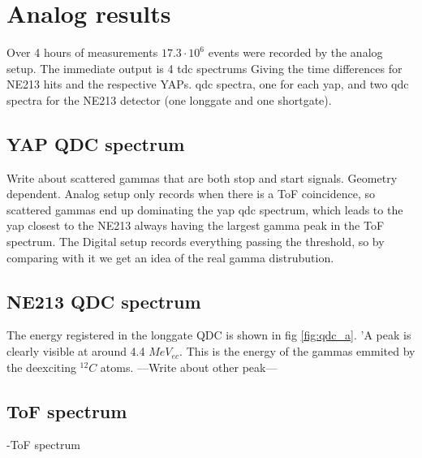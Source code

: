 \documentclass[main.tex]{subfiles}
\begin{document}
\section{Analog results}
Over 4 hours of measurements $17.3\cdot 10^{6}$ events were recorded by the analog setup. The immediate output is 4 tdc spectrums Giving the time differences for NE213 hits and the respective YAPs. qdc spectra, one for each yap, and two qdc spectra for the NE213 detector (one longgate and one shortgate). 

\subsection{YAP QDC spectrum}
Write about scattered gammas that are both stop and start signals. Geometry dependent. Analog setup only records when there is a ToF coincidence, so scattered gammas end up dominating the yap qdc spectrum, which leads to the yap closest to the NE213 always having the largest gamma peak in the ToF spectrum. The Digital setup records everything passing the threshold, so by comparing with it we get an idea of the real gamma distrubution.

\newpage
\subsection{NE213 QDC spectrum}
The energy registered in the longgate QDC is shown in fig \ref{fig:qdc_a}. 'A peak is clearly visible at around 4.4 $MeV_{ec}$. This is the energy of the gammas emmited by the deexciting $^{12}C$ atoms. ---Write about other peak---

\subsection{ToF spectrum}
-ToF spectrum
\end{document}
